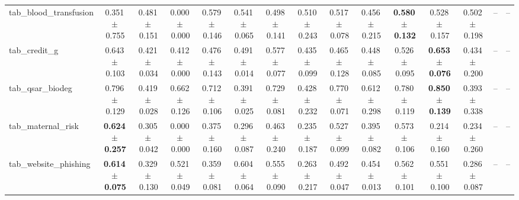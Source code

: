 \documentclass[8pt]{extarticle}
\begin{document}
\begin{longtable}{l*{14}{c}}
tab\_blood\_transfusion & 0.351\,$\pm$\,0.755 & 0.481\,$\pm$\,0.151 & 0.000\,$\pm$\,0.000 & 0.579\,$\pm$\,0.146 & 0.541\,$\pm$\,0.065 & 0.498\,$\pm$\,0.141 & 0.510\,$\pm$\,0.243 & 0.517\,$\pm$\,0.078 & 0.456\,$\pm$\,0.215 & \textbf{0.580\,$\pm$\,0.132} & 0.528\,$\pm$\,0.157 & 0.502\,$\pm$\,0.198 & -- & -- \\
tab\_credit\_g & 0.643\,$\pm$\,0.103 & 0.421\,$\pm$\,0.034 & 0.412\,$\pm$\,0.000 & 0.476\,$\pm$\,0.143 & 0.491\,$\pm$\,0.014 & 0.577\,$\pm$\,0.077 & 0.435\,$\pm$\,0.099 & 0.465\,$\pm$\,0.128 & 0.448\,$\pm$\,0.085 & 0.526\,$\pm$\,0.095 & \textbf{0.653\,$\pm$\,0.076} & 0.434\,$\pm$\,0.200 & -- & -- \\
tab\_qsar\_biodeg & 0.796\,$\pm$\,0.129 & 0.419\,$\pm$\,0.028 & 0.662\,$\pm$\,0.126 & 0.712\,$\pm$\,0.106 & 0.391\,$\pm$\,0.025 & 0.729\,$\pm$\,0.081 & 0.428\,$\pm$\,0.232 & 0.770\,$\pm$\,0.071 & 0.612\,$\pm$\,0.298 & 0.780\,$\pm$\,0.119 & \textbf{0.850\,$\pm$\,0.139} & 0.393\,$\pm$\,0.338 & -- & -- \\
tab\_maternal\_risk & \textbf{0.624\,$\pm$\,0.257} & 0.305\,$\pm$\,0.042 & 0.000\,$\pm$\,0.000 & 0.375\,$\pm$\,0.160 & 0.296\,$\pm$\,0.087 & 0.463\,$\pm$\,0.240 & 0.235\,$\pm$\,0.187 & 0.527\,$\pm$\,0.099 & 0.395\,$\pm$\,0.082 & 0.573\,$\pm$\,0.106 & 0.214\,$\pm$\,0.160 & 0.234\,$\pm$\,0.260 & -- & -- \\
tab\_website\_phishing & \textbf{0.614\,$\pm$\,0.075} & 0.329\,$\pm$\,0.130 & 0.521\,$\pm$\,0.049 & 0.359\,$\pm$\,0.081 & 0.604\,$\pm$\,0.064 & 0.555\,$\pm$\,0.090 & 0.263\,$\pm$\,0.217 & 0.492\,$\pm$\,0.047 & 0.454\,$\pm$\,0.013 & 0.562\,$\pm$\,0.101 & 0.551\,$\pm$\,0.100 & 0.286\,$\pm$\,0.087 & -- & -- \\
\end{longtable}
\end{document}
